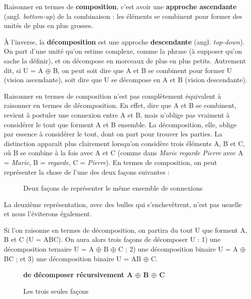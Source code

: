 Raisonner en termes de \textbf{composition}, c’est avoir une \textbf{approche ascendante} (angl. \textit{bottom-up}) de la combinaison : les éléments se combinent pour former des unités de plus en plus grosses.

À l’inverse, la \textbf{décomposition} est une approche \textbf{descendante} (angl. \textit{top-down}). On part d’une unité qu’on estime complexe, comme la phrase (à supposer qu’on sache la définir), et on décompose en morceaux de plus en plus petits. Autrement dit, si U = A ${\oplus}$ B, on peut soit dire que A et B se combinent pour former U (vision ascendante), soit dire que U se décompose en A et B (vision descendante).

Raisonner en termes de composition n’est pas complètement équivalent à raisonner en termes de décomposition. En effet, dire que A et B se combinent, revient à postuler une connexion entre A et B, mais n’oblige pas vraiment à considérer le tout que forment A et B ensemble. La décomposition, elle, oblige par essence à considérer le tout, dont on part pour trouver les parties. La distinction apparaît plus clairement lorsqu’on considère trois éléments A, B et C, où B se combine à la fois avec A et C (comme dans \textit{Marie regarde Pierre} avec A = \textit{Marie}, B = \textit{regarde}, C = \textit{Pierre}). En termes de composition, on peut représenter la chose de l’une des deux façons suivantes :

\begin{figure}

\caption{\label{fig:}Deux façons de représenter le même ensemble de connexions}
\end{figure}

La deuxième représentation, avec des bulles qui s’enchevêtrent, n’est pas usuelle et nous l’éviterons également.

Si l’on raisonne en termes de décomposition, on partira du tout U que forment A, B et C (U = ABC). On aura alors trois façons de décomposer U : 1) une décomposition ternaire U = A ${\oplus}$ B ${\oplus}$ C ; 2) une décomposition binaire U = A ${\oplus}$ BC ; et 3) une décomposition binaire U = AB ${\oplus}$ C.

\begin{figure}


\caption{\label{fig:}Les trois seules façons} \textbf{de décomposer récursivement A ${\oplus}$ B ${\oplus}$ C}
\end{figure}

